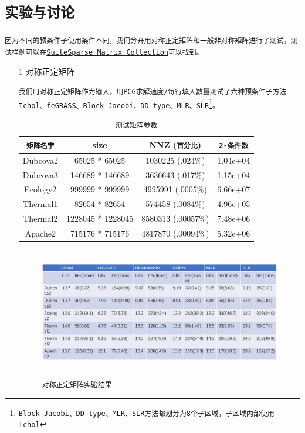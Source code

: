 \documentclass[11pt, a4paper]{article}
\theoremstyle{plain}
\theoremstyle{plain}
\theoremstyle{plain}
\theoremstyle{definition}
\theoremstyle{remark}
\theoremstyle{definition}
\newcommand{\T}[1]{\texttt{#1}}
\begin{document}
\section*{\T{实验与讨论}}
\T{因为不同的预条件子使用条件不同，我们分开用对称正定矩阵和一般非对称矩阵进行了测试，测试样例可以在\href{http://sparse.tamu.edu/}{SuiteSparse Matrix Collection}可以找到\cite{Test}。}
\begin{itemize}
	\item[1] 对称正定矩阵
	
	\T{我们用对称正定矩阵作为输入，用PCG求解速度/每行填入数量测试了六种预条件子方法Ichol、feGRASS、Block Jacobi、DD type、MLR、SLR\footnote{Block Jacobi、DD type、MLR、SLR方法都划分为8个子区域，子区域内部使用Ichol}。}
	
	\begin{center}
		\begin{table}[H]
			\caption{\T{测试矩阵参数}}
			\begin{center}
				\begin{tabular}{ c|c|c|c}
					\T{矩阵名字} & size & NNZ (\T{百分比}) & \T{2-条件数} \\
					\hline
					Dubcova2 & 65025 * 65025 & 1030225 (.024\%) & 1.04e+04 \\
					\hline
					Dubcova3 & 146689 * 146689 & 3636643 (.017\%) & 1.15e+04 \\
					\hline
					Ecology2 & 999999 * 999999 & 4995991 (.0005\%) & 6.66e+07 \\
					\hline
					Thermal1 & 82654 * 82654 & 574458 (.0084\%) & 4.96e+05	\\
					\hline
					Thermal2 & 1228045 * 1228045 & 8580313 (.00057\%) & 7.48e+06 \\
					\hline
					Apache2 & 715176 * 715176 & 4817870 (.00094\%) & 5.32e+06 \\											
				\end{tabular}
			\end{center}
		\end{table}
	\end{center}
	
	\begin{figure}[H]
		\caption{\T{对称正定矩阵实验结果}}
		\centering
		\includegraphics[width=350pt,height=160pt]{SPD_res.png}
	\end{figure}



\end{itemize}
\end{document}

